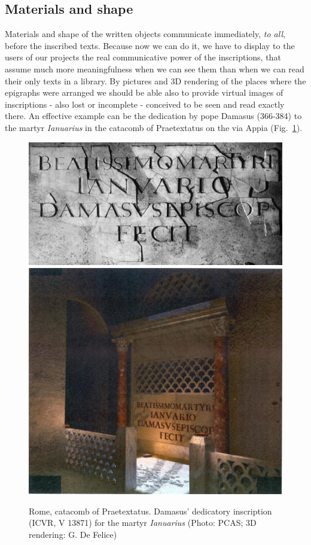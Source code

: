 \documentclass[amsthm,ebook]{saparticle}
\begin{document}
\subsection{Materials and shape }


\noindent Materials and shape of the written objects communicate immediately, \emph{to all}, before the inscribed texts. Because now we
can do it, we have to display to the users of our projects the real communicative power of the inscriptions, that
assume much more meaningfulness when we can see them than when we can read their only texts in a library. By pictures
and 3D rendering of the places where the epigraphs were arranged we should be able also to provide virtual images of
inscriptions {}- also lost or incomplete - conceived to be seen and read exactly there. An effective example can be
the dedication by pope Damasus (366-384) to the martyr \emph{Ianuarius} in the catacomb of Praetextatus on the via Appia (Fig.~\ref{fig:6}). 

\begin{figure}[!bp]
\centering
 \includegraphics[scale=0.4]{FelleVisualFeaturesofinscriptionsEAGLE2016FullPaper-img008.jpg}
 \includegraphics[scale=0.3]{FelleVisualFeaturesofinscriptionsEAGLE2016FullPaper-img009.jpg}
\caption{Rome, catacomb of Praetextatus. Damasus’ dedicatory inscription (ICVR, V 13871) for the martyr \emph{Ianuarius} (Photo:
PCAS; 3D rendering: G. De Felice)}
\label{fig:6}
\end{figure}
\end{document}

